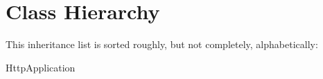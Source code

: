 \section{Class Hierarchy}
This inheritance list is sorted roughly, but not completely, alphabetically\+:\begin{DoxyCompactList}
\item Http\+Application\begin{DoxyCompactList}
\item {}
\end{DoxyCompactList}
\item {}
\end{DoxyCompactList}

